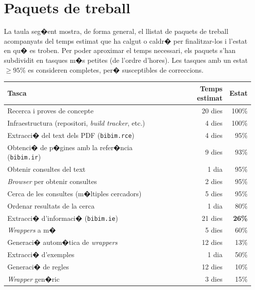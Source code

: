 \documentclass[a4paper,oneside]{article}
\newcommand{\tab}{\hspace*{2em}}
\begin{document}
\section{Paquets de treball}
La taula seg�ent mostra, de forma general, el llistat de paquets de treball acompanyats del temps estimat que ha calgut o caldr� per finalitzar-los i l'estat en qu� es troben. Per poder aproximar el temps necessari, els paquets s'han subdividit en tasques m�s petites (de l'ordre d'hores). Les tasques amb un estat $\geq 95\%$ es consideren completes, per� susceptibles de correccions.

\begin{center}
\begin{tabular}{|l|r|r|}
\hline

\hline
\textbf{Tasca}                                                              & \textbf{Temps estimat}     & \textbf{Estat} \\
\hline
\hline


Recerca i proves de concepte                                                &20 dies    & 100\% \\
\hline

Infraestructura (repositori, \textit{build tracker}, etc.)                  &4 dies     & 100\% \\
\hline

Extracci� del text dels PDF (\texttt{bibim.rce})                            &4 dies     & 95\% \\
\hline


Obtenci� de p�gines amb la refer�ncia (\texttt{bibim.ir})                   &9 dies     & 93\%\\
\tab Obtenir consultes del text                                             &1 dia      & 95\%\\
\tab \textit{Browser} per obtenir consultes                                 &2 dies     & 95\% \\
\tab Cerca de les consultes (m�ltiples cercadors)                           &5 dies     & 95\%\\
\tab Ordenar resultats de la cerca                                          &1 dia      & 80\%\\
\hline


Extracci� d'informaci� (\texttt{bibim.ie})                                  &21 dies    & \textbf{26\%}\\
\tab \textit{Wrappers} a m�                                                 &5 dies     & 60\% \\
\tab Generaci� autom�tica de \textit{wrappers}                              &12 dies    & 13\%\\
\tab \tab Extracci� d'exemples                                              &1 dia      & 50\%\\
\tab \tab Generaci� de regles                                               &12 dies    & 10\%\\
\tab \tab \textit{Wrapper} gen�ric                                          &3 dies     & 15\%\\
\hline


\end{tabular}
\end{center}
\end{document}
